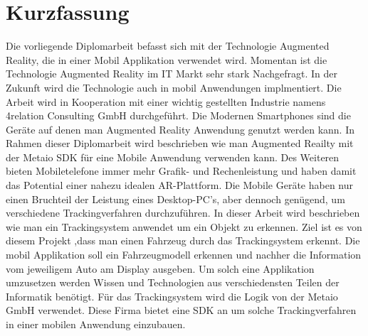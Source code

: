 
\chapter*{Kurzfassung}

Die vorliegende Diplomarbeit befasst sich mit der Technologie Augmented Reality, die in einer Mobil Applikation verwendet wird. Momentan ist die Technologie Augmented Reality im IT Markt sehr stark Nachgefragt. In der Zukunft wird die Technologie auch in mobil Anwendungen implmentiert. Die Arbeit wird in Kooperation mit einer wichtig gestellten Industrie namens 4relation Consulting GmbH durchgeführt. Die Modernen Smartphones  sind die Geräte  auf denen man Augmented Reality Anwendung genutzt werden kann. In Rahmen dieser Diplomarbeit wird beschrieben wie man Augmented Reailty mit der Metaio SDK für eine Mobile Anwendung verwenden kann. Des Weiteren bieten Mobiletelefone  immer mehr Grafik- und Rechenleistung und haben damit das Potential einer nahezu idealen AR-Plattform. Die Mobile Geräte haben nur einen Bruchteil der Leistung eines Desktop-PC's, aber dennoch genügend, um verschiedene Trackingverfahren durchzuführen. In dieser Arbeit wird beschrieben wie man ein Trackingsystem anwendet um ein Objekt zu erkennen. Ziel ist es von diesem Projekt ,dass man einen Fahrzeug durch das Trackingsystem erkennt. Die mobil Applikation soll ein Fahrzeugmodell erkennen und nachher die Information vom jeweiligem Auto am Display ausgeben. Um solch eine Applikation umzusetzen werden Wissen und Technologien aus verschiedensten Teilen der Informatik benötigt. Für das Trackingsystem wird die Logik von der Metaio GmbH verwendet. Diese Firma bietet eine SDK an um solche Trackingverfahren in einer mobilen Anwendung einzubauen.